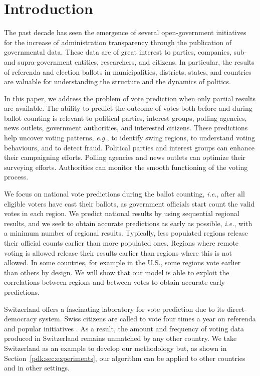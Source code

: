 \section{Introduction}%
\label{pdk:sec:introduction}

The past decade has seen the emergence of several open-government initiatives for the increase of administration transparency through the publication of governmental data.
These data are of great interest to parties, companies, sub- and supra-government entities, researchers, and citizens.
In particular, the results of referenda and election ballots in municipalities, districts, states, and countries are valuable for understanding the structure and the dynamics of politics.

In this paper, we address the problem of vote prediction when only partial results are available.
The ability to predict the outcome of votes both before and during ballot counting is relevant to political parties, interest groups, polling agencies, news outlets, government authorities, and interested citizens.
These predictions help uncover voting patterns, \textit{e.g.}, to identify swing regions, to understand voting behaviours, and to detect fraud.
Political parties and interest groups can enhance their campaigning efforts.
Polling agencies and news outlets can optimize their surveying efforts.
Authorities can monitor the smooth functioning of the voting process.

We focus on national vote predictions during the ballot counting, \textit{i.e.}, after all eligible voters have cast their ballots, as government officials start count the valid votes in each region.
We predict national results by using sequential regional results, and we seek to obtain accurate predictions as early as possible, \textit{i.e.}, with a minimum number of regional results.
Typically, less populated regions release their official counts earlier than more populated ones.
Regions where remote voting is allowed release their results earlier than regions where this is not allowed.
In some countries, for example in the U.S., some regions vote earlier than others by design.
We will show that our model is able to exploit the correlations between regions and between votes to obtain accurate early predictions.

Switzerland offers a fascinating laboratory for vote prediction due to its direct-democracy system.
Swiss citizens are called to vote four times a year on referenda and popular initiatives \citep{confederation2019democracy, confederation2019popular}.
As a result, the amount and frequency of voting data produced in Switzerland remains unmatched by any other country.
We take Switzerland as an example to develop our methodology but, as shown in Section~\ref{pdk:sec:experiments}, our algorithm can be applied to other countries and in other settings.

